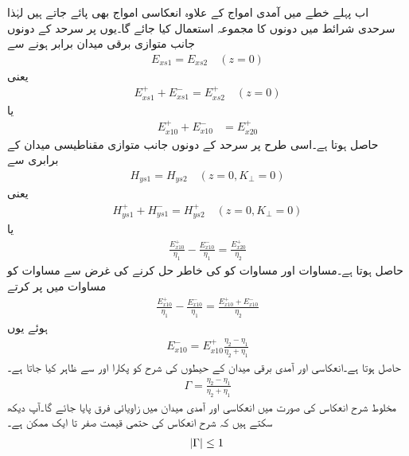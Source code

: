 اب پہلے خطے میں آمدی امواج کے علاوہ انعکاسی امواج بھی پائے جاتے ہیں لہٰذا سرحدی شرائط میں دونوں کا مجموعہ استعمال کیا جائے گا۔یوں  پر سرحد کے دونوں جانب متوازی برقی میدان برابر  ہونے سے
\begin{align*}
E_{xs1}=E_{xs2}    \quad (z=0)
\end{align*}
یعنی
\begin{align*}
E_{xs1}^+ +E_{xs1}^-=E_{xs2}^+ \quad (z=0)
\end{align*}
یا
\begin{align}\label{مساوات_موج_برقی_شرط_پورا}
E_{x10}^+ + E_{x10}^-&=E_{x20}^+
\end{align}
حاصل ہوتا ہے۔اسی طرح   پر سرحد کے دونوں جانب متوازی مقناطیسی میدان کے برابری سے
\begin{align*}
H_{ys1}=H_{ys2} \quad (z=0, K_\perp=0)
\end{align*}
یعنی
\begin{align*}
H_{ys1}^+ +H_{ys1}^-=H_{ys2}^+ \quad (z=0, K_\perp=0)
\end{align*}
یا
\begin{align}\label{مساوات_موج_مقناطیسی_شرط_پورا}
\frac{E_{x10}^+}{\eta_1}-\frac{E_{x10}^-}{\eta_1}=\frac{E_{x20}^+}{\eta_2}
\end{align}
حاصل ہوتا ہے۔مساوات  اور مساوات  کو  کی خاطر حل کرنے کی غرض سے مساوات  کو مساوات  میں پر کرتے
\begin{align*}
\frac{E_{x10}^+}{\eta_1}-\frac{E_{x10}^-}{\eta_1}=\frac{E_{x10}^+ + E_{x10}^-}{\eta_2}
\end{align*}
ہوئے یوں
\begin{align*}
E_{x10}^- =E_{x10}^+ \frac{\eta_2-\eta_1}{\eta_2+\eta_1}
\end{align*}
حاصل ہوتا ہے۔انعکاسی اور آمدی برقی میدان کے حیطوں کی شرح کو  پکارا  اور  سے ظاہر کیا جاتا ہے۔
\begin{align}\label{مساوات_موج_شرح_انعکاس_تعریف}
\Gamma=\frac{\eta_2-\eta_1}{\eta_2+\eta_1}
\end{align}
مخلوط شرح انعکاس کی صورت میں انعکاسی اور آمدی میدان میں زاویائی فرق پایا جائے گا۔آپ دیکھ سکتے ہیں کہ شرح انعکاس کی حتمی قیمت صفر تا ایک ممکن ہے۔
\begin{align}
\abs{\Gamma} \le 1
\end{align}

